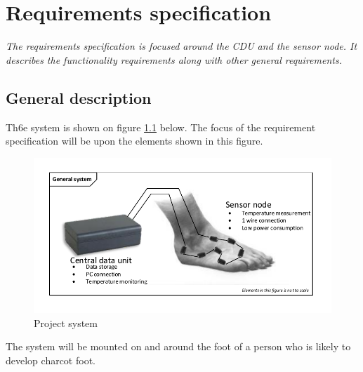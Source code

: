 \chapter{Requirements specification}
\textit{The requirements specification is focused around the CDU and the sensor node. It describes the functionality requirements along with other general requirements.}
\section{General description}
Th6e system is shown on figure \ref{fig:project_system} below. The focus of the requirement specification will be upon the elements shown in this figure.
\begin{figure}[H]
	\centering
	\includegraphics[width=.9\textwidth]{billeder/7requirementspec/GeneralSystem}
	\caption{Project system}
	\label{fig:project_system}
\end{figure}
The system will be mounted on and around the foot of a person who is likely to develop charcot foot. 
